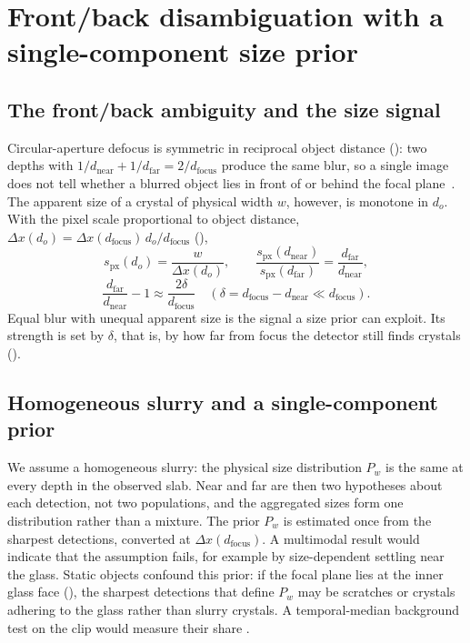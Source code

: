 \section{Front/back disambiguation with a single-component size prior}\label{sec:sizing}

\subsection{The front/back ambiguity and the size signal}\label{sec:ambiguity}

Circular-aperture defocus is symmetric in reciprocal object distance (): two depths with
$1/d_\mathrm{near} + 1/d_\mathrm{far} = 2/d_\mathrm{focus}$ produce the same blur, so a single image does not tell
whether a blurred object lies in front of or behind the focal plane~\citep{SellentFavaro2014}. The apparent size of a
crystal of physical width $w$, however, is monotone in $d_o$. With the pixel scale proportional to object distance,
$\Delta x(d_o) = \Delta x(d_\mathrm{focus})\, d_o / d_\mathrm{focus}$ (),
\begin{equation}\label{eq:spx}
s_\mathrm{px}(d_o) = \frac{w}{\Delta x(d_o)}, \qquad
\frac{s_\mathrm{px}(d_\mathrm{near})}{s_\mathrm{px}(d_\mathrm{far})} = \frac{d_\mathrm{far}}{d_\mathrm{near}},
\end{equation}
\begin{equation}\label{eq:ratio}
\frac{d_\mathrm{far}}{d_\mathrm{near}} - 1 \approx \frac{2\delta}{d_\mathrm{focus}} \quad
(\delta = d_\mathrm{focus} - d_\mathrm{near} \ll d_\mathrm{focus}).
\end{equation}
Equal blur with unequal apparent size is the signal a size prior can exploit. Its strength is set by $\delta$, that
is, by how far from focus the detector still finds crystals ().

\subsection{Homogeneous slurry and a single-component prior}\label{sec:homog}

We assume a homogeneous slurry: the physical size distribution $P_w$ is the same at every depth in the observed slab.
Near and far are then two hypotheses about each detection, not two populations, and the aggregated sizes form one
distribution rather than a mixture. The prior $P_w$ is estimated once from the sharpest detections, converted at
$\Delta x(d_\mathrm{focus})$. A multimodal result would indicate that the assumption fails, for example by
size-dependent settling near the glass. Static objects confound this prior: if the focal plane lies at the inner
glass face (), the sharpest detections that define $P_w$ may be scratches or crystals adhering to the
glass rather than slurry crystals. A temporal-median background test on the clip would measure their share
.

